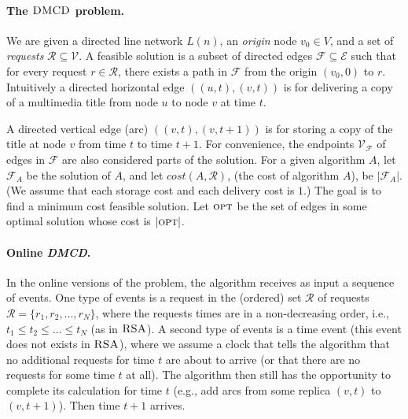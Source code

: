 \documentclass[11pt]{article}
\newcommand{\rot}[0]{v_0}
\newcommand{\DMCD}{\mbox{\sc DMCD}}
\newcommand{\RSA}{\mbox{\sc RSA}}
\newcommand{\cost}[0]{cost}
\newcommand{\calV}{\mathcal{V}}
\newcommand{\calE}{\mathcal{E}}
\newcommand{\calF}{\mathcal{F}}
\newcommand{\calR}{\mathcal{R}}
\newcommand{\opt}{\mbox{\textsc{opt}}}
\begin{document}
\paragraph*{\bf The $\DMCD$ problem.}

We are given a directed line network $L(n)$, an \emph{origin} node  $\rot \in V$,
and a set of \emph{requests} $\calR \subseteq \calV$.
A feasible solution
is a subset of directed edges $\calF\subseteq\calE$
such that for every request $r\in\calR$, there exists a path in $\calF$ from the origin $(\rot,0)$ to $r$.
Intuitively a directed horizontal edge $((u,t),(v,t))$ is for delivering a copy of a multimedia title from node $u$ to node $v$ at time $t$.

A directed vertical edge (arc) $((v,t),(v,t+1))$ is for storing a copy of the title at node $v$ from time $t$ to time $t+1$.
For convenience, the endpoints $\calV_\calF$ of edges in $\calF$ are also considered parts of the solution.
For a given algorithm $A$, let $\calF_A$ be the solution of $A$, and let $\cost(A,\calR)$, (the cost of  algorithm $A$), be $|\calF_A|$.
(We assume that each storage cost and each delivery cost is $1$.)
The goal is to find a minimum cost feasible solution.
Let $\opt$ be the set of edges in some optimal solution whose cost is $|\opt|$.













\vspace{-0.3cm}
\paragraph{\bf Online {\bf \em DMCD}.}
\label{app:online}
In the online versions of the problem,  the algorithm receives as input a sequence of events.
One type of events is a request in the (ordered)
set $\calR$ of requests $\calR= \{r_1, r_2, ...,r_N\}$,
where the requests times are in a non-decreasing order, i.e.,  $t_1\leq t_2 \leq ...\leq t_N$ (as in $\RSA$).
A second type of events is a time event (this event does not exists in $\RSA$),
where we assume a clock that tells the algorithm that
no additional requests for time $t$ are about to arrive (or that there are no requests for some time $t$ at all).
The algorithm then still has the opportunity to complete its calculation for time $t$ (e.g., add arcs from some replica $(v,t)$ to $(v,t+1)$).
Then time $t+1$ arrives.
\end{document}
